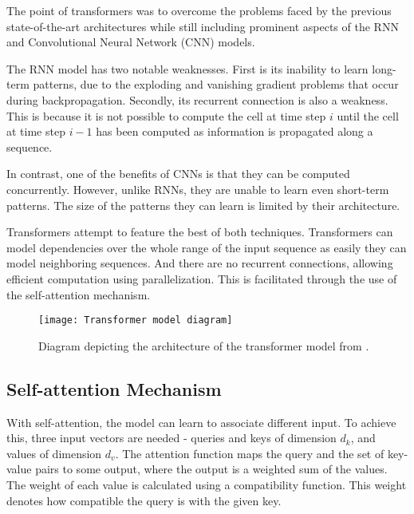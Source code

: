 The point of transformers was to overcome the problems faced by the previous state-of-the-art architectures while still including prominent aspects of the RNN and Convolutional Neural Network (CNN) models.

The RNN model has two notable weaknesses. First is its inability to learn long-term patterns, due to the exploding and vanishing gradient problems that occur during backpropagation.
Secondly, its recurrent connection is also a weakness. This is because it is not possible to compute the cell at time step $i$ until the cell at time step $i-1$ has been computed as information is propagated along a sequence.

In contrast, one of the benefits of CNNs is that they can be computed concurrently. However, unlike RNNs, they are unable to learn even short-term patterns. The size of the patterns they can learn is limited by their architecture.

Transformers attempt to feature the best of both techniques.
Transformers can model dependencies over the whole range of the input sequence as easily they can model neighboring sequences. And there are no recurrent connections, allowing efficient computation using parallelization. This is facilitated through the use of the self-attention mechanism.\cite{TransformersScratchPeterbloem}

\begin{figure}[h]
  \centering
  \texttt{[image: Transformer model diagram]}
  \caption{Diagram depicting the architecture of the transformer model from \citet{AttentionIsAllYouNeed}.}
  \label{fig:original transformer}
\end{figure}
 
\subsection{Self-attention Mechanism}


With self-attention, the model can learn to associate different input.
To achieve this, three input vectors are needed - queries and keys of dimension $d_k$, and values of dimension $d_v$.
The attention function maps the query and the set of key-value pairs to some output, where the output is a weighted sum of the values.
The weight of each value is calculated using a compatibility function.
This weight denotes how compatible the query is with the given key.



